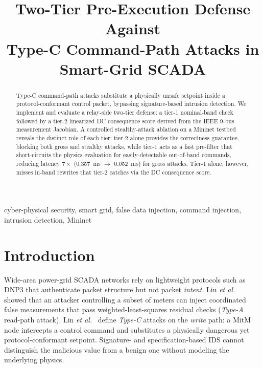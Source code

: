 \documentclass[conference]{IEEEtran}
\begin{document}
\title{Two-Tier Pre-Execution Defense Against\\Type-C Command-Path Attacks in Smart-Grid SCADA}

\author{
}

\maketitle

\begin{abstract}
Type-C command-path attacks substitute a physically unsafe setpoint inside a protocol-conformant control packet, bypassing signature-based intrusion detection. We implement and evaluate a relay-side two-tier defense: a tier-1 nominal-band check followed by a tier-2 linearized DC consequence score derived from the IEEE 9-bus measurement Jacobian. A controlled stealthy-attack ablation on a Mininet testbed reveals the distinct role of each tier: tier-2 alone provides the correctness guarantee, blocking both gross and stealthy attacks, while tier-1 acts as a fast pre-filter that short-circuits the physics evaluation for easily-detectable out-of-band commands, reducing latency $7\times$ (0.357~ms $\to$ 0.052~ms) for gross attacks. Tier-1 alone, however, misses in-band rewrites that tier-2 catches via the DC consequence score.
\end{abstract}

\begin{IEEEkeywords}
cyber-physical security, smart grid, false data injection, command injection, intrusion detection, Mininet
\end{IEEEkeywords}

\section{Introduction}\label{sec:intro}
Wide-area power-grid SCADA networks rely on lightweight protocols such as DNP3 \cite{dnp3spec} that authenticate packet structure but not packet \emph{intent}. Liu \emph{et al.}\ \cite{liuFalseDataInjection} showed that an attacker controlling a subset of meters can inject coordinated false measurements that pass weighted-least-squares residual checks (\emph{Type-A} read-path attack). Lin \emph{et al.}\ \cite{linSafetycriticalCyberphysicalAttacks2016,linChallengesOpportunitiesDetection2020} define \emph{Type-C} attacks on the \emph{write} path: a MitM node intercepts a control command and substitutes a physically dangerous yet protocol-conformant setpoint. Signature- and specification-based IDS \cite{aliConfigurationbasedIDSAdvanced2013,senSpecificationbasedCyberattackDetection2022,yangMultiattributeSCADA2014} cannot distinguish the malicious value from a benign one without modeling the underlying physics.
\end{document}

